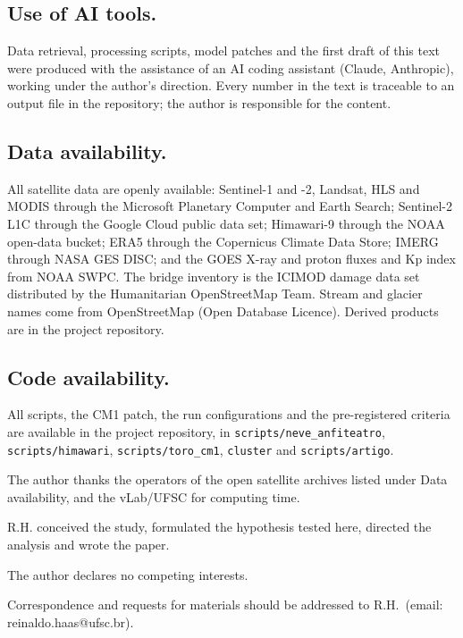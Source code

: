 \documentclass{nature}
\begin{document}
\begin{methods}
\subsection{Use of AI tools.}
Data retrieval, processing scripts, model patches and the first draft of this text were produced with the assistance of an AI coding assistant (Claude, Anthropic), working under the author's direction. Every number in the text is traceable to an output file in the repository; the author is responsible for the content.

\subsection{Data availability.}
All satellite data are openly available: Sentinel-1 and -2, Landsat, HLS and MODIS through the Microsoft Planetary Computer and Earth Search; Sentinel-2 L1C through the Google Cloud public data set; Himawari-9 through the NOAA open-data bucket; ERA5 through the Copernicus Climate Data Store; IMERG through NASA GES DISC; and the GOES X-ray and proton fluxes and Kp index from NOAA SWPC. The bridge inventory is the ICIMOD damage data set distributed by the Humanitarian OpenStreetMap Team. Stream and glacier names come from OpenStreetMap (Open Database Licence). Derived products are in the project repository\cite{haas2026repo}.

\subsection{Code availability.}
All scripts, the CM1 patch, the run configurations and the pre-registered criteria are available in the project repository\cite{haas2026repo}, in \texttt{scripts/neve\_anfiteatro}, \texttt{scripts/himawari}, \texttt{scripts/toro\_cm1}, \texttt{cluster} and \texttt{scripts/artigo}.

\end{methods}



\begin{addendum}
 \item The author thanks the operators of the open satellite archives listed under Data availability, and the vLab/UFSC for computing time.
 \item[Author contributions] R.H. conceived the study, formulated the hypothesis tested here, directed the analysis and wrote the paper.
 \item[Competing interests] The author declares no competing interests.
 \item[Correspondence] Correspondence and requests for materials should be addressed to R.H.\ (email: reinaldo.haas@ufsc.br).
\end{addendum}
\end{document}
